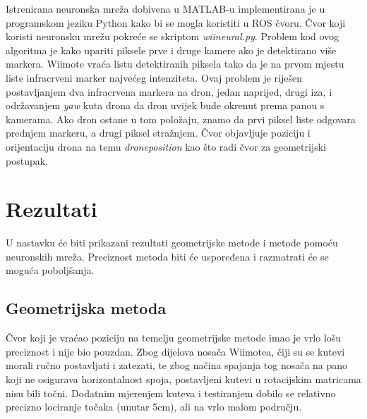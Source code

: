\documentclass[times, utf8, diplomski]{fer}
\begin{document}
Istrenirana neuronska mreža dobivena u MATLAB-u implementirana je u programskom jeziku Python kako bi se mogla koristiti u ROS čvoru. Čvor koji koristi neuronsku mrežu pokreće se skriptom \textit{wii\textunderscore neural.py}. Problem kod ovog algoritma je kako upariti piksele prve i druge kamere ako je detektirano više markera. Wiimote vraća listu detektiranih piksela tako da je na prvom mjestu liste infracrveni marker najvećeg intenziteta. Ovaj problem je riješen postavljanjem dva infracrvena markera na dron, jedan naprijed, drugi iza, i održavanjem \textit{yaw} kuta drona da dron uvijek bude okrenut prema panou s kamerama. Ako dron ostane u tom položaju, znamo da prvi piksel liste odgovara prednjem markeru, a drugi piksel stražnjem. Čvor objavljuje poziciju i orijentaciju drona na temu \textit{drone\textunderscore position} kao što radi čvor za geometrijski postupak.

\chapter{Rezultati}
U nastavku će biti prikazani rezultati geometrijske metode i metode pomoću neuronskih mreža. Preciznost metoda biti će uspoređena i razmatrati će se moguća poboljšanja.

\section{Geometrijska metoda}
Čvor koji je vraćao poziciju na temelju geometrijske metode imao je vrlo lošu preciznost i nije bio pouzdan. Zbog dijelova nosača Wiimotea, čiji su se kutevi morali ručno postavljati i zatezati, te zbog načina spajanja tog nosača na pano koji ne osigurava horizontalnost spoja, postavljeni kutevi u rotacijskim matricama nisu bili točni. Dodatnim mjerenjem kuteva i testiranjem dobilo se relativno precizno lociranje točaka (unutar 5cm), ali na vrlo malom području.
\end{document}
